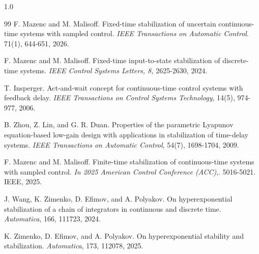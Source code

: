\documentclass[journal]{IEEEtran}
\begin{document}
\begin{spacing}{1.0}
\begin{thebibliography}{99}
F. Mazenc and M. Malisoff. Fixed-time stabilization of
uncertain continuous-time systems with sampled control. \textit{IEEE
Transactions on Automatic Control}. 71(1), 644-651, 2026.

F. Mazenc and M. Malisoff. Fixed-time input-to-state
stabilization of discrete-time systems. \textit{IEEE Control Systems Letters,
8, }2625-2630, 2024.

T. Insperger. Act-and-wait concept for continuous-time
control systems with feedback delay. \textit{IEEE Transactions on Control
Systems Technology}, 14(5), 974-977, 2006.

B. Zhou, Z. Lin, and G. R. Duan. Properties of the
parametric Lyapunov equation-based low-gain design with applications in
stabilization of time-delay systems. \textit{IEEE Transactions on Automatic
Control}, 54(7), 1698-1704, 2009.

F. Mazenc and M. Malisoff. Finite-time stabilization of
continuous-time systems with sampled control. \textit{In 2025 American Control
Conference (ACC)},. 5016-5021. IEEE, 2025.

J. Wang, K. Zimenko, D. Efimov, and A. Polyakov. On
hyperexponential stabilization of a chain of integrators in continuous and
discrete time. \textit{Automatica}, 166, 111723, 2024.

K. Zimenko, D. Efimov, and A. Polyakov. On
hyperexponential stability and stabilization. \textit{Automatica}, 173,
112078, 2025.

\end{thebibliography}


\end{spacing}
\end{document}

